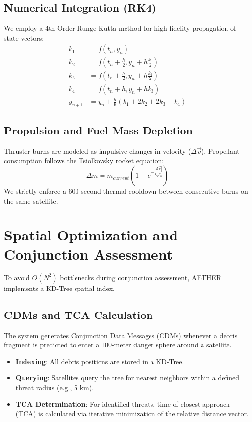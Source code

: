 \documentclass[11pt,a4paper]{article}
\begin{document}
\subsection{Numerical Integration (RK4)}
We employ a 4th Order Runge-Kutta method for high-fidelity propagation of state vectors:
\begin{align*}
    k_1 &= f(t_n, y_n) \\
    k_2 &= f(t_n + \frac{h}{2}, y_n + h \frac{k_1}{2}) \\
    k_3 &= f(t_n + \frac{h}{2}, y_n + h \frac{k_2}{2}) \\
    k_4 &= f(t_n + h, y_n + h k_3) \\
    y_{n+1} &= y_n + \frac{h}{6} (k_1 + 2k_2 + 2k_3 + k_4)
\end{align*}

\subsection{Propulsion and Fuel Mass Depletion}
Thruster burns are modeled as impulsive changes in velocity ($\Delta \vec{v}$). Propellant consumption follows the Tsiolkovsky rocket equation:
\begin{equation}
    \Delta m = m_{current} \left( 1 - e^{-\frac{|\Delta \vec{v}|}{I_{sp} g_0}} \right)
\end{equation}
We strictly enforce a 600-second thermal cooldown between consecutive burns on the same satellite.

\section{Spatial Optimization and Conjunction Assessment}
\label{sec:spatial}
To avoid $O(N^2)$ bottlenecks during conjunction assessment, AETHER implements a KD-Tree spatial index. 

\subsection{CDMs and TCA Calculation}
The system generates Conjunction Data Messages (CDMs) whenever a debris fragment is predicted to enter a 100-meter danger sphere around a satellite.
\begin{itemize}
    \item \textbf{Indexing}: All debris positions are stored in a KD-Tree.
    \item \textbf{Querying}: Satellites query the tree for nearest neighbors within a defined threat radius (e.g., 5 km).
    \item \textbf{TCA Determination}: For identified threats, time of closest approach (TCA) is calculated via iterative minimization of the relative distance vector.
\end{itemize}
\end{document}
